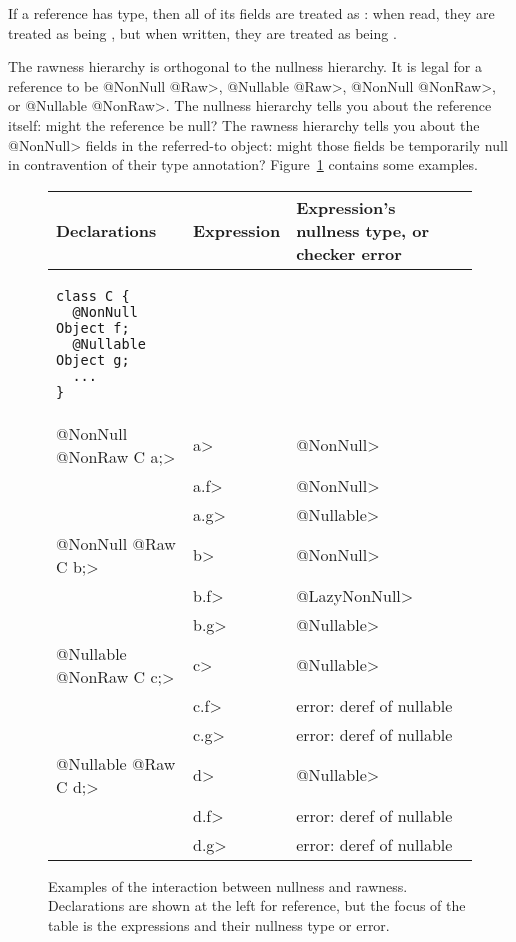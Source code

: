 
If a reference has
 type, then all of its  fields are treated as
:  when read, they are
treated as being , but when
written, they are treated as being
.


The rawness hierarchy is orthogonal to the nullness hierarchy.  It
is legal for a reference to be \<@NonNull @Raw>, \<@Nullable @Raw>,
\<@NonNull @NonRaw>, or \<@Nullable @NonRaw>.  The nullness hierarchy tells
you about the reference itself:  might the reference be null?  The rawness
hierarchy tells you about the \<@NonNull> fields in the referred-to object:
might those fields be temporarily null in contravention of their
type annotation?
Figure~\ref{fig:rawness-examples} contains some examples.

\begin{figure}
\begin{tabular}{l|l|l}
Declarations & Expression & Expression's nullness type, or checker error \\ \hline
\begin{minipage}{1.5in}
\begin{Verbatim}
class C {
  @NonNull Object f;
  @Nullable Object g;
  ...
}
\end{Verbatim}
\end{minipage} & & \\ \cline{2-3}
\<@NonNull @NonRaw C a;>
& \<a> & \<@NonNull> \\
& \<a.f> & \<@NonNull> \\
& \<a.g> & \<@Nullable> \\ \cline{2-3}
\<@NonNull @Raw C b;>
& \<b> & \<@NonNull> \\
& \<b.f> & \<@LazyNonNull> \\
& \<b.g> & \<@Nullable> \\ \cline{2-3}
\<@Nullable @NonRaw C c;>
& \<c> & \<@Nullable> \\
& \<c.f> & error: deref of nullable \\
& \<c.g> & error: deref of nullable \\ \cline{2-3}
\<@Nullable @Raw C d;>
& \<d> & \<@Nullable> \\
& \<d.f> & error: deref of nullable \\
& \<d.g> & error: deref of nullable \\
\end{tabular}
\caption{Examples of the interaction between nullness and rawness.
  Declarations are shown at the left for reference, but the focus of the
  table is the expressions and their nullness type or error.}
\label{fig:rawness-examples}
\end{figure}


